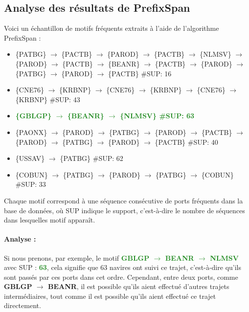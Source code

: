 \documentclass[a4paper,12pt]{article}
\begin{document}
\subsection{Analyse des résultats de PrefixSpan}
Voici un échantillon de motifs fréquents extraits à l'aide de l'algorithme PrefixSpan :
\vspace{0.2cm}
\begin{itemize}
    \item \{PATBG\} $\rightarrow$ \{PACTB\} $\rightarrow$ \{PAROD\} $\rightarrow$ \{PACTB\} $\rightarrow$ \{NLMSV\} $\rightarrow$ \{PAROD\} $\rightarrow$ \{PACTB\} $\rightarrow$ \{BEANR\} $\rightarrow$ \{PACTB\} $\rightarrow$ \{PAROD\} $\rightarrow$ \{PATBG\} $\rightarrow$ \{PAROD\} $\rightarrow$ \{PACTB\} \#SUP: 16
    \vspace{10pt}
    \item \{CNE76\} $\rightarrow$ \{KRBNP\} $\rightarrow$ \{CNE76\} $\rightarrow$ \{KRBNP\} $\rightarrow$ \{CNE76\} $\rightarrow$ \{KRBNP\} \#SUP: 43
     \vspace{10pt}
   
    \item \textcolor{ForestGreen}{\textbf{\{GBLGP\} $\rightarrow$ \{BEANR\} $\rightarrow$ \{NLMSV\} \#SUP: 63}}
     \vspace{10pt}
    \item \{PAONX\} $\rightarrow$ \{PAROD\} $\rightarrow$ \{PATBG\} $\rightarrow$ \{PAROD\} $\rightarrow$ \{PACTB\} $\rightarrow$ \{PAROD\} $\rightarrow$ \{PATBG\} $\rightarrow$ \{PAROD\} $\rightarrow$ \{PACTB\} \#SUP: 40
     \vspace{10pt}
    \item \{USSAV\} $\rightarrow$ \{PATBG\} \#SUP: 62
     \vspace{10pt}
    \item \{COBUN\} $\rightarrow$ \{PATBG\} $\rightarrow$ \{PAROD\} $\rightarrow$ \{PATBG\} $\rightarrow$ \{COBUN\} \#SUP: 33
     \vspace{10pt}
\end{itemize}

\vspace{20pt}
\noindent
Chaque motif correspond à une séquence consécutive de ports fréquents dans la base de données, où SUP indique le support, c'est-à-dire le nombre de séquences dans lesquelles  motif apparaît.

\paragraph{Analyse :\\} 
\vspace{0.2cm}
Si nous prenons, par exemple, le motif \textcolor{ForestGreen}{\textbf{{GBLGP} $\rightarrow$ {BEANR} $\rightarrow$ {NLMSV}}} avec SUP : \textcolor{ForestGreen}{\textbf{63}}, cela signifie que 63 navires ont suivi ce trajet, c'est-à-dire qu'ils sont passés par ces ports dans cet ordre. Cependant, entre deux ports, comme \textbf{{GBLGP} $\rightarrow$ {BEANR}}, il est possible qu'ils aient effectué d'autres trajets intermédiaires, tout comme il est possible qu'ils aient effectué ce trajet directement.
\newpage
\end{document}
